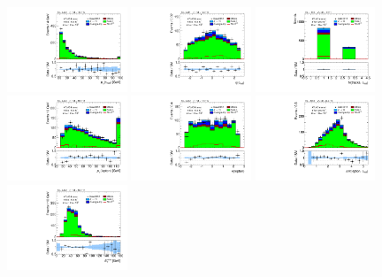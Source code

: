 \begin{figure}[tp]
  \centering
  \includegraphics[width=0.32\textwidth]{figures/analysis/vbf-WlvCR/tau-pt}
  \includegraphics[width=0.32\textwidth]{figures/analysis/vbf-WlvCR/tau-eta}
  \includegraphics[width=0.32\textwidth]{figures/analysis/vbf-WlvCR/tau-numTrack}
  \includegraphics[width=0.32\textwidth]{figures/analysis/vbf-WlvCR/lep-pt-hi}
  \includegraphics[width=0.32\textwidth]{figures/analysis/vbf-WlvCR/lep-eta}
  \includegraphics[width=0.32\textwidth]{figures/analysis/vbf-WlvCR/taulep-dR}
  \includegraphics[width=0.32\textwidth]{figures/analysis/vbf-WlvCR/met-pt-hi}

\end{figure}
